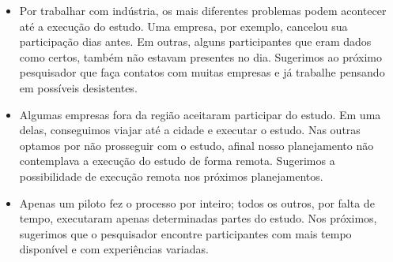 \begin{itemize}
	\item Por trabalhar com indústria, os mais diferentes problemas podem acontecer 
	até a execução do estudo. Uma empresa, por exemplo, cancelou sua participação
	dias antes. Em outras, alguns participantes que eram dados como certos, também
	não estavam presentes no dia. Sugerimos ao próximo pesquisador que faça contatos
	com muitas empresas e já trabalhe pensando em possíveis desistentes.
	
	\item Algumas empresas fora da região aceitaram participar do estudo. Em uma delas,
	conseguimos viajar até a cidade e executar o estudo. Nas outras optamos por não
	prosseguir com o estudo, afinal nosso planejamento não contemplava a execução
	do estudo de forma remota. Sugerimos a possibilidade de execução remota nos 
	próximos planejamentos.
	
	\item Apenas um piloto fez o processo por inteiro; todos os outros, por falta de tempo, 
	executaram apenas determinadas partes do estudo. Nos próximos, sugerimos
	que o pesquisador encontre participantes com mais tempo disponível e com experiências
	variadas.  
	
\end{itemize}
